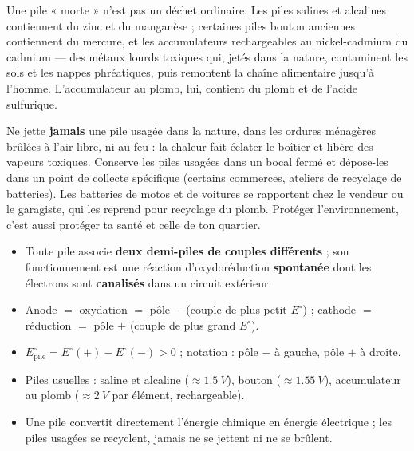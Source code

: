 \documentclass[11pt]{article}
\newcommand{\cle}[1]{{\popxbold\color{popdark}#1}}
\newcounter{popsec}
\newcounter{popsub}
\newcommand{\courssub}[1]{%
  \stepcounter{popsub}%
  \par\vspace{9pt}\noindent{\popxbold\fontsize{11.5}{13}\selectfont\color{popink}{\color{poporange}\thepopsec.\thepopsub}\hspace{6pt}#1}\par\nopagebreak\vspace{4pt}
}
\begin{document}
\courssub{Piles usagées et environnement}

Une pile « morte » n'est pas un déchet ordinaire. Les piles salines et alcalines contiennent du \cle{zinc} et du \cle{manganèse} ; certaines piles bouton anciennes contiennent du \cle{mercure}, et les accumulateurs rechargeables au nickel-cadmium du \cle{cadmium} — des métaux lourds toxiques qui, jetés dans la nature, contaminent les sols et les nappes phréatiques, puis remontent la chaîne alimentaire jusqu'à l'homme. L'accumulateur au plomb, lui, contient du plomb et de l'acide sulfurique.

\begin{attention}
Ne jette \textbf{jamais} une pile usagée dans la nature, dans les ordures ménagères brûlées à l'air libre, ni au feu : la chaleur fait éclater le boîtier et libère des vapeurs toxiques. Conserve les piles usagées dans un bocal fermé et dépose-les dans un point de collecte spécifique (certains commerces, ateliers de recyclage de batteries). Les batteries de motos et de voitures se rapportent chez le vendeur ou le garagiste, qui les reprend pour recyclage du plomb. Protéger l'environnement, c'est aussi protéger ta santé et celle de ton quartier.
\end{attention}

\begin{aretenir}
\begin{itemize}
\item Toute pile associe \textbf{deux demi-piles de couples différents} ; son fonctionnement est une réaction d'oxydoréduction \textbf{spontanée} dont les électrons sont \textbf{canalisés} dans un circuit extérieur.
\item Anode $=$ oxydation $=$ pôle $-$ (couple de plus petit $E^\circ$) ; cathode $=$ réduction $=$ pôle $+$ (couple de plus grand $E^\circ$).
\item $E^\circ_{\text{pile}} = E^\circ(+) - E^\circ(-) > 0$ ; notation : pôle $-$ à gauche, pôle $+$ à droite.
\item Piles usuelles : saline et alcaline ($\approx \SI{1,5}{V}$), bouton ($\approx \SI{1,55}{V}$), accumulateur au plomb ($\approx \SI{2}{V}$ par élément, rechargeable).
\item Une pile convertit directement l'énergie chimique en énergie électrique ; les piles usagées se recyclent, jamais ne se jettent ni ne se brûlent.
\end{itemize}
\end{aretenir}
\end{document}
